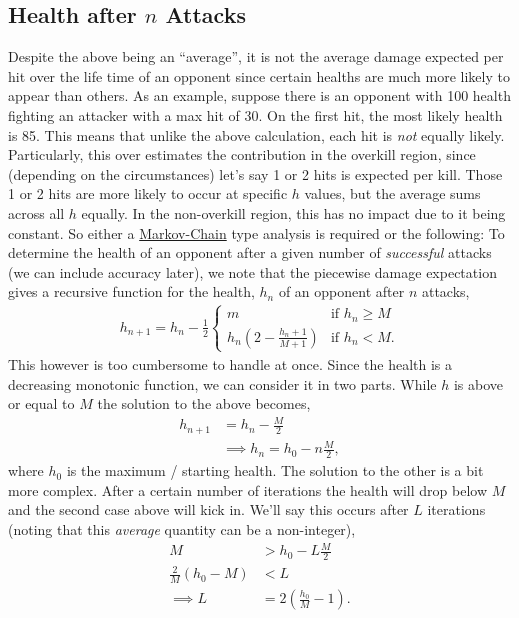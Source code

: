 \documentclass[../../main.tex]{subfiles}
\begin{document}
		\subsection{Health after $n$ Attacks}
			Despite the above being an ``average'', it is not the average damage expected per hit over the life time of an opponent since certain healths are much more likely to appear than others. As an example, suppose there is an opponent with 100 health fighting an attacker with a max hit of 30. On the first hit, the most likely health is 85. This means that unlike the above calculation, each hit is \emph{not} equally likely. Particularly, this over estimates the contribution in the overkill region, since (depending on the circumstances) let's say 1 or 2 hits is expected per kill. Those 1 or 2 hits are more likely to occur at specific $h$ values, but the average sums across all $h$ equally. In the non-overkill region, this has no impact due to it being constant. So either a \href{https://en.wikipedia.org/wiki/Markov_chain}{Markov-Chain} type analysis is required or the following: To determine the health of an opponent after a given number of \textit{successful} attacks (we can include accuracy later), we note that the piecewise damage expectation gives a recursive function for the health, $h_n$ of an opponent after $n$ attacks,
			\begin{align}
				h_{n+1} = h_{n} - \frac{1}{2}\begin{cases}
					m &\text{if $h_n \ge M$} \\
					h_n\left(2 - \frac{h_n + 1}{M+1}\right) &\text{if $h_n < M$}.
				\end{cases}
			\end{align}
			This however is too cumbersome to handle at once. Since the health is a decreasing monotonic function, we can consider it in two parts. While $h$ is above or equal to $M$ the solution to the above becomes,
			\begin{align}
				h_{n+1} &= h_{n} - \frac{M}{2} \\
				&\implies h_n = h_0 - n\frac{M}{2},\label{eq:h_crude}
			\end{align}
			where $h_0$ is the maximum / starting health. The solution to the other is a bit more complex. After a certain number of iterations the health will drop below $M$ and the second case above will kick in. We'll say this occurs after $L$ iterations (noting that this \emph{average} quantity can be a non-integer),
			\begin{align}
				M &> h_0 - L\frac{M}{2} \\
				\frac{2}{M}(h_0 - M) &< L \\
				\implies L &= 2\left(\frac{h_0}{M} - 1\right).
			\end{align}
\end{document}
